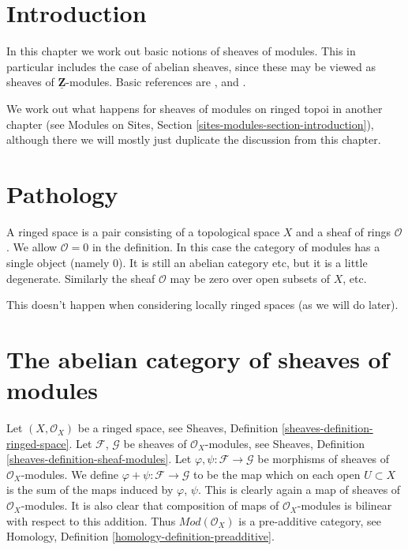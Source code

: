 \section{Introduction}
\label{modules-section-introduction}
In this chapter we work out basic notions of sheaves of modules.
This in particular includes the case of abelian sheaves, since
these may be viewed as sheaves of $\underline{\mathbf{Z}}$-modules.
Basic references are \cite{FAC}, \cite{EGA} and \cite{SGA4}.

\medskip\noindent
We work out what happens for sheaves of modules on ringed topoi
in another chapter (see
Modules on Sites, Section \ref{sites-modules-section-introduction}),
although there we will mostly just duplicate the discussion
from this chapter.

\section{Pathology}
\label{modules-section-pathology}
A ringed space is a pair consisting of a topological space $X$
and a sheaf of rings $\mathcal{O}$. We allow $\mathcal{O} = 0$
in the definition. In this case the category of modules has a
single object (namely $0$). It is still an abelian category etc,
but it is a little degenerate. Similarly the sheaf $\mathcal{O}$
may be zero over open subsets of $X$, etc.

\medskip\noindent
This doesn't happen when considering locally ringed spaces (as we
will do later).

\section{The abelian category of sheaves of modules}
\label{modules-section-kernels}
Let $(X, \mathcal{O}_X)$ be a ringed space, see
Sheaves, Definition \ref{sheaves-definition-ringed-space}.
Let $\mathcal{F}$, $\mathcal{G}$ be sheaves of $\mathcal{O}_X$-modules, see
Sheaves, Definition \ref{sheaves-definition-sheaf-modules}.
Let $\varphi, \psi : \mathcal{F} \to \mathcal{G}$
be morphisms of sheaves of $\mathcal{O}_X$-modules.
We define $\varphi + \psi : \mathcal{F} \to \mathcal{G}$
to be the map which on each open $U \subset X$ is the
sum of the maps induced by $\varphi$, $\psi$. This is
clearly again a map of sheaves of $\mathcal{O}_X$-modules.
It is also clear that composition of maps of
$\mathcal{O}_X$-modules is bilinear with respect to this
addition. Thus $\textit{Mod}(\mathcal{O}_X)$ is a pre-additive
category, see Homology, Definition \ref{homology-definition-preadditive}.


